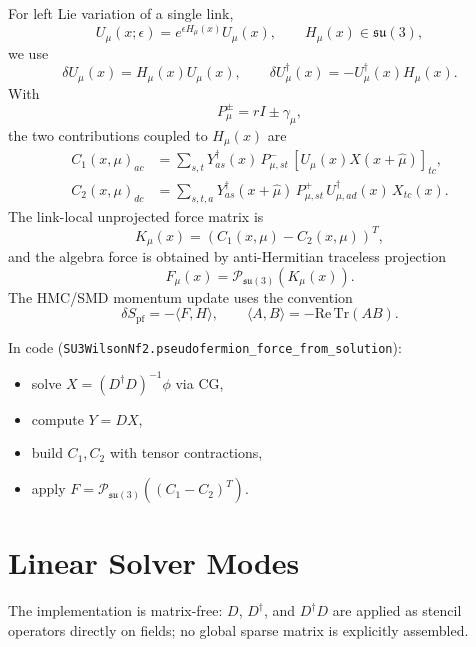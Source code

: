 \documentclass[11pt]{article}
\begin{document}
For left Lie variation of a single link,
\begin{equation}
U_\mu(x;\epsilon)=e^{\epsilon H_\mu(x)}U_\mu(x),
\qquad
H_\mu(x)\in \mathfrak{su}(3),
\end{equation}
we use
\begin{equation}
\delta U_\mu(x)=H_\mu(x)U_\mu(x),\qquad
\delta U_\mu^\dagger(x)=-U_\mu^\dagger(x)H_\mu(x).
\end{equation}
With
\begin{equation}
P_\mu^\pm = r I \pm \gamma_\mu,
\end{equation}
the two contributions coupled to $H_\mu(x)$ are
\begin{align}
C_1(x,\mu)_{ac}
&=
\sum_{s,t}
Y^\dagger_{a s}(x)\,
P^-_{\mu,st}\,
\left[U_\mu(x)X(x+\hat\mu)\right]_{tc},\\
C_2(x,\mu)_{dc}
&=
\sum_{s,t,a}
Y^\dagger_{a s}(x+\hat\mu)\,
P^+_{\mu,st}\,
U^\dagger_{\mu,ad}(x)\,
X_{tc}(x).
\end{align}
The link-local unprojected force matrix is
\begin{equation}
K_\mu(x)=\left(C_1(x,\mu)-C_2(x,\mu)\right)^T,
\end{equation}
and the algebra force is obtained by anti-Hermitian traceless projection
\begin{equation}
F_\mu(x)=\mathcal{P}_{\mathfrak{su}(3)}\!\left(K_\mu(x)\right).
\end{equation}
The HMC/SMD momentum update uses the convention
\begin{equation}
\delta S_{\mathrm{pf}} = -\langle F, H\rangle,\qquad
\langle A,B\rangle = -\mathrm{Re}\,\mathrm{Tr}(AB).
\end{equation}

In code (\texttt{SU3WilsonNf2.pseudofermion\_force\_from\_solution}):
\begin{itemize}
  \item solve $X=(D^\dagger D)^{-1}\phi$ via CG,
  \item compute $Y=DX$,
  \item build $C_1,C_2$ with tensor contractions,
  \item apply $F=\mathcal{P}_{\mathfrak{su}(3)}((C_1-C_2)^T)$.
\end{itemize}

\section{Linear Solver Modes}
The implementation is matrix-free: $D$, $D^\dagger$, and $D^\dagger D$ are applied as stencil operators
directly on fields; no global sparse matrix is explicitly assembled.
\end{document}
